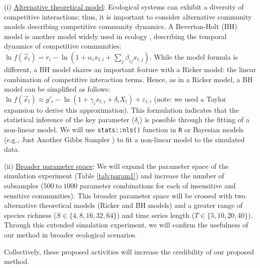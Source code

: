 \documentclass[12pt, class=article, crop=false]{standalone}
\begin{document}
(i) \ul{Alternative theoretical model}:
Ecological systems can exhibit a diversity of competitive interactions; thus, it is important to consider alternative community models describing competitive community dynamics. 
A Beverton-Holt (BH) model is another model widely used in ecology \citep{otto_biologists_2011}, describing the temporal dynamics of competitive communities: $\ln f(\overset{\rightarrow}{x}_{t}) = r_i - \ln(1 + \alpha_i x_{t,i} + \sum_j \beta_{ij} x_{t,j})$. 
While the model formula is different, a BH model shares an important feature with a Ricker model: the linear combination of competitive interaction terms.
Hence, as in a Ricker model, a BH model can be simplified as follows: $\ln f(\overset{\rightarrow}{x}_{t}) \approx g'_{i} - \ln(1 + \gamma_i x_{t,i} + \delta_i X_t) + \varepsilon_{t,i}$ (note: we used a Taylor expansion to derive this approximation).
This formulation indicates that the statistical inference of the key parameter ($\delta_i$) is possible through the fitting of a non-linear model.
We will use \texttt{stats::nls()} function in \texttt{R} or Bayesian models (e.g., Just Another Gibbs Sampler \citep{plummer_jags_2003}) to fit a non-linear model to the simulated data.

(ii) \ul{Broader parameter space}: We will expand the parameter space of the simulation experiment (Table \ref{tab:param1}) and increase the number of subsamples ($500~\mbox{to}~1000$ parameter combinations for each of insensitive and sensitive communities).
This broader parameter space will be crossed with two alternative theoretical models (Ricker and BH models) and a greater range of species richness ($S \in \{4, 8, 16, 32, 64\}$) and time series length ($T \in \{5, 10, 20, 40\}$).
Through this extended simulation experiment, we will confirm the usefulness of our method in broader ecological scenarios.

Collectively, these proposed activities will increase the credibility of our proposed method.
\end{document}
